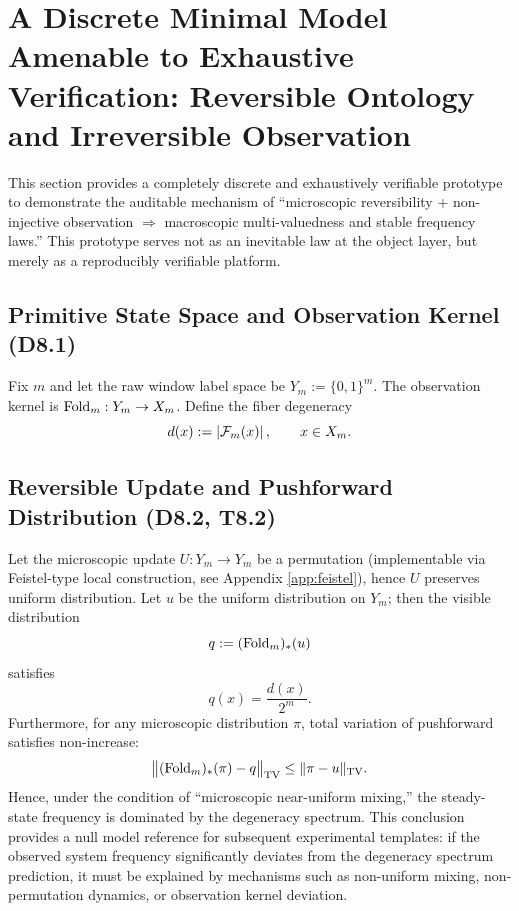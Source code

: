\section{A Discrete Minimal Model Amenable to Exhaustive Verification: Reversible Ontology and Irreversible Observation}

This section provides a completely discrete and exhaustively verifiable prototype to demonstrate the auditable mechanism of ``microscopic reversibility + non-injective observation $\Rightarrow$ macroscopic multi-valuedness and stable frequency laws.'' This prototype serves not as an inevitable law at the object layer, but merely as a reproducibly verifiable platform.

\subsection{Primitive State Space and Observation Kernel (D8.1)}

Fix $m$ and let the raw window label space be $Y_m:=\{0,1\}^m$. The observation kernel is $\mathrm{Fold}_m:Y_m\to X_m$. Define the fiber degeneracy
\[
d(x):=\left\lvert \mathcal{F}_m(x)\right\rvert,\qquad x\in X_m.
\]

\subsection{Reversible Update and Pushforward Distribution (D8.2, T8.2)}

Let the microscopic update $U:Y_m\to Y_m$ be a permutation (implementable via Feistel-type local construction, see Appendix \ref{app:feistel}), hence $U$ preserves uniform distribution. Let $u$ be the uniform distribution on $Y_m$; then the visible distribution
\[
q:= (\mathrm{Fold}_m)_*(u)
\]
satisfies
\[
q(x)=\frac{d(x)}{2^m}.
\]
Furthermore, for any microscopic distribution $\pi$, total variation of pushforward satisfies non-increase:
\[
\big\|(\mathrm{Fold}_m)_*(\pi)-q\big\|_{\mathrm{TV}}
\le \|\pi-u\|_{\mathrm{TV}}.
\]
Hence, under the condition of ``microscopic near-uniform mixing,'' the steady-state frequency is dominated by the degeneracy spectrum. This conclusion provides a null model reference for subsequent experimental templates: if the observed system frequency significantly deviates from the degeneracy spectrum prediction, it must be explained by mechanisms such as non-uniform mixing, non-permutation dynamics, or observation kernel deviation.
